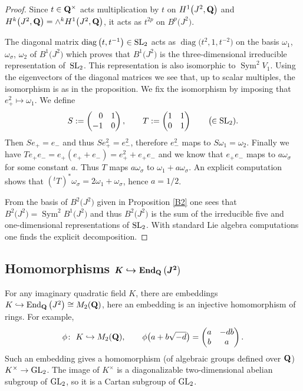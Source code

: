 \documentclass[10pt,a4paper]{amsart}
\numberwithin{equation}{section}
\begin{document}
\begin{proof}
Since $t\in{\bf Q}^\times$ acts multiplication by $t$ on $H^1\big(J^2,{\bf Q}\big)$ and
$H^k\big(J^2,{\bf Q}\big)=\wedge^kH^1\big(J^2,{\bf Q}\big)$, it acts as $t^{2p}$ on $B^p\big(J^2\big)$.

The diagonal matrix $\operatorname{diag}\big(t,t^{-1}\big)\in {\rm SL}_2$ acts as $\operatorname{diag}\big(t^{2},1,t^{-2}\big)$
on the basis $\omega_1$, $\omega_\sigma$, $\omega_2$ of $B^1\big(J^2\big)$ which proves that $B^1\big(J^2\big)$
is the three-dimensional irreducible representation of~${\rm SL}_2$.
This representation is also isomorphic to $\operatorname{Sym}^2V_1$. Using the eigenvectors of the
diagonal matrices we see that, up to scalar multiples,
the isomorphism is as in the proposition.
We fix the isomorphism by imposing that $e_+^2\mapsto \omega_1$. We define
\[
S := \begin{pmatrix}\hphantom{-}0&1\\-1&0\end{pmatrix},\qquad T := \begin{pmatrix}1&1\\0&1\end{pmatrix}
\qquad\big(\!\!\in {\rm SL}_2).
\]
Then $Se_+=e_-$ and thus $Se_+^2=e_-^2$, therefore $e_-^2$ maps to $S\omega_1=\omega_2$.
Finally we have $Te_+e_-=e_+(e_++e_-)=e_+^2+e_+e_-$ and we know that $e_+e_-$ maps to
$a\omega_\sigma$ for some constant $a$. Thus $T$ maps $a\omega_\sigma$ to $\omega_1+a\omega_\sigma$.
An explicit computation shows that $({}^tT)^*\omega_\sigma=2\omega_1+\omega_\sigma$,
hence $a=1/2$.

From the basis of $B^2\big(J^2\big)$ given in Proposition \ref{B2} one sees that
$B^2\big(J^2\big)=\operatorname{Sym}^2B^1\big(J^2\big)$
and thus $B^2\big(J^2\big)$ is the sum of the irreducible five and one-dimensional representations of ${\rm SL}_2$.
With standard Lie algebra computations one finds the explicit decomposition.
\end{proof}

\subsection[Homomorphisms K hookrightarrow End\_Q(J\^{}2)]{Homomorphisms $\boldsymbol{K\hookrightarrow \operatorname{End}_{\bf Q}\big(J^2\big)}$}\label{KEnd}

For any imaginary quadratic field $K$,
there are embeddings $K\hookrightarrow \operatorname{End}_{\bf Q}\big(J^2\big)\cong M_2({\bf Q})$,
here an embedding is an injective homomorphism of rings. For example,
\[
\phi\colon \ K \hookrightarrow M_2({\bf Q}),\qquad \phi\big(a+b\sqrt{-d}\big) =
\begin{pmatrix}a &-db\\b&a\end{pmatrix}.
\]
Such an embedding gives a homomorphism (of algebraic groups defined over ${\bf Q}$)
$K^\times \rightarrow {\rm GL}_2$.
The image of $K^\times$ is a diagonalizable two-dimensional abelian subgroup of ${\rm GL}_2$,
so it is a Cartan subgroup of ${\rm GL}_2$.
\end{document}
